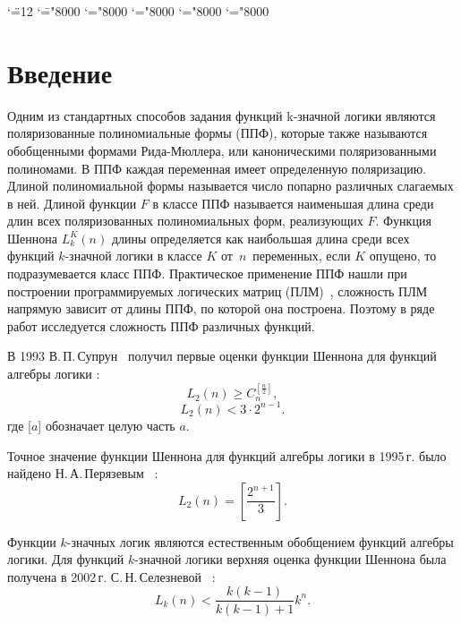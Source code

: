 \documentclass[a4paper, 12pt]{extarticle}
\begin{document}
\begingroup \catcode`\"=12
\gdef\newmcodes@{\mathcode`\'39\mathcode`\*42\mathcode`\."613A%
\mathcode`\-"8000\mathcode`\/47\mathcode`\:"603A\relax}%
\endgroup
\mathcode`\=="8000 \mathcode`\+="8000 \mathcode`\-="8000
\mathcode`\<="8000 \mathcode`\>="8000



\setcounter{secnumdepth}{-1}

\section{Введение}
Одним из стандартных способов задания функций k\nobreakdash-значной логики являются поляризованные полиномиальные формы (ППФ),
которые также называются обобщенными формами Рида-Мюллера, или каноническими поляризованными полиномами. В ППФ каждая переменная
имеет определенную поляризацию. Длиной полиномиальной формы называется число попарно различных слагаемых в ней. Длиной функции
$F$ в классе ППФ называется наименьшая длина среди длин всех поляризованных полиномиальных форм, реализующих $F$.
Функция Шеннона $L^K_k(n)$ длины определяется как наибольшая длина среди всех функций $k$\nobreakdash-значной логики в классе $K$
от~$n$~переменных, если $K$ опущено, то подразумевается класс ППФ.
Практическое применение ППФ нашли при построении программируемых логических матриц (ПЛМ)~\cite{ue04, sb90}, сложность ПЛМ
напрямую зависит от длины ППФ, по которой она построена. Поэтому в ряде работ исследуется сложность ППФ различных функций.

В 1993  В.\,П.\,Супрун~\cite{sv93} получил первые оценки функции Шеннона для функций алгебры логики :
$$
L_2(n) \geqslant C_n^{[\frac{n}{2}]},
$$
$$
L_2(n) < 3 \cdot 2^{n-1}.
$$
где [$a$] обозначает целую часть $a$.

Точное значение функции Шеннона для функций алгебры логики в 1995\,г. было
найдено Н.\,А.\,Перязевым~\cite{pn95} :
$$
L_2(n) = \left[\frac{2^{n+1}}{3}\right].
$$

Функции $k$\nobreakdash-значных логик являются естественным обобщением функций алгебры логики.
Для функций $k$\nobreakdash-значной логики верхняя оценка функции Шеннона была получена в 2002\,г. С.\,Н.\,Селезневой~\cite{ss02} :
$$
L_k(n) < \frac{k(k-1)}{k(k-1)+1}k^n.
$$
\end{document}
